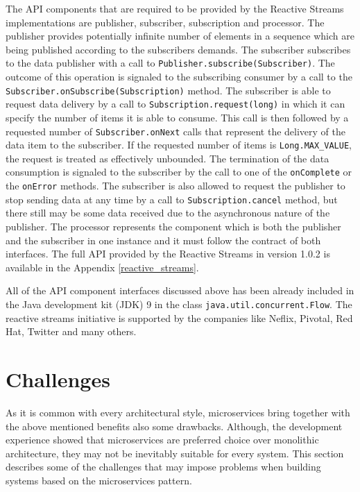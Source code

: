 \documentclass[oneside,
  digital, %
  table,   %
  nolof,     %
  nolot,     %
]{fithesis3}
\begin{document}
The API components that are required to be provided by the Reactive Streams implementations are publisher, subscriber, subscription and processor. The publisher provides potentially infinite number of elements in a sequence which are being published according to the subscribers demands. The subscriber subscribes to the data publisher with a call to \texttt{Publisher.subscribe(Subscriber)}. The outcome of this operation is signaled to the subscribing consumer by a call to the \texttt{Subscriber.onSubscribe(Subscription)} method. The subscriber is  able to request data delivery by a call to \texttt{Subscription.request(long)} in which it can specify the number of items it is able to consume. This call is then followed by a requested number of \texttt{Subscriber.onNext} calls that represent the delivery of the data item to the subscriber. If the requested number of items is \texttt{Long.MAX\_VALUE}, the request is treated as effectively unbounded. The termination of the data consumption is signaled to the subscriber by the call to one of the \texttt{onComplete} or the \texttt{onError} methods. The subscriber is also allowed to request the publisher to stop sending data at any time by a call to \texttt{Subscription.cancel} method, but there still may be some data received due to the asynchronous nature of the publisher. The processor represents the component which is both the publisher and the subscriber in one instance and it must follow the contract of both interfaces. The full API provided by the Reactive Streams in version 1.0.2 is available in the Appendix \ref{reactive_streams}.

All of the API component interfaces discussed above has been already included in the Java development kit (JDK) 9 in the class \texttt{java.util.concurrent.Flow}. The reactive streams initiative is supported by the companies like Neflix, Pivotal, Red Hat, Twitter and many others.

\section{Challenges}

As it is common with every architectural style, microservices bring together with the above mentioned benefits also some drawbacks. Although, the development experience showed that microservices are preferred choice over monolithic architecture, they may not be inevitably suitable for every system. This section describes some of the challenges that may impose problems when building systems based on the microservices pattern.
\end{document}
